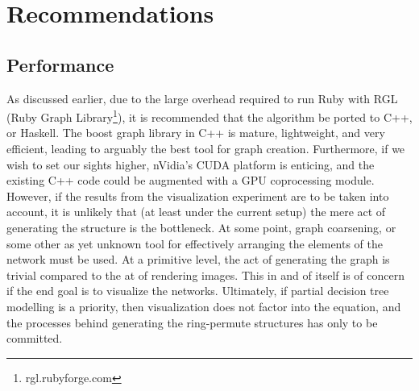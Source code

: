 \documentclass[12pt]{article}
\begin{document}
\section{Recommendations}
\setlength{\parindent}{1cm}
\subsection{Performance}
As discussed earlier, due to the large overhead required to run Ruby with RGL (Ruby Graph Library\footnote{rgl.rubyforge.com}), it is recommended that the algorithm be ported to C++, or Haskell.
The boost graph library in C++ is mature, lightweight, and very efficient, leading to arguably the best tool for graph creation.
Furthermore, if we wish to set our sights higher, nVidia's CUDA platform is enticing, and the existing C++ code could be augmented with a GPU coprocessing module.
However, if the results from the visualization experiment are to be taken into account, it is unlikely that (at least under the current setup) the mere act of generating the structure is the bottleneck.
At some point, graph coarsening, or some other as yet unknown tool for effectively arranging the elements of the network must be used.
At a primitive level, the act of generating the graph is trivial compared to the at of rendering images.
This in and of itself is of concern if the end goal is to visualize the networks.
Ultimately, if partial decision tree modelling is a priority, then visualization does not factor into the equation, and the processes behind generating the ring-permute structures has only to be committed.\\
\pagebreak[1]
\end{document}
